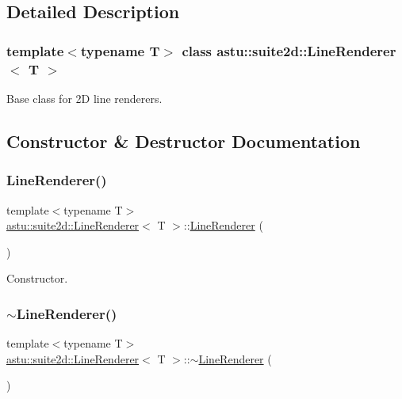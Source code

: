 \subsection{Detailed Description}
\subsubsection*{template$<$typename T$>$\newline
class astu\+::suite2d\+::\+Line\+Renderer$<$ T $>$}

Base class for 2D line renderers. 

\subsection{Constructor \& Destructor Documentation}
\mbox{\label{classastu_1_1suite2d_1_1LineRenderer_a8bb16da2cda699189626ffccb8de5857}} 
\subsubsection{\texorpdfstring{Line\+Renderer()}{LineRenderer()}}
{\footnotesize\ttfamily template$<$typename T$>$ \\
\hyperlink{classastu_1_1suite2d_1_1LineRenderer}{astu\+::suite2d\+::\+Line\+Renderer}$<$ T $>$\+::\hyperlink{classastu_1_1suite2d_1_1LineRenderer}{Line\+Renderer} (\begin{DoxyParamCaption}{ }\end{DoxyParamCaption})\hspace{0.3cm}{\ttfamily [inline]}}

Constructor. \mbox{\label{classastu_1_1suite2d_1_1LineRenderer_a585ff276f2e424e07aba120b0c4d0b7f}} 
\subsubsection{\texorpdfstring{$\sim$\+Line\+Renderer()}{~LineRenderer()}}
{\footnotesize\ttfamily template$<$typename T$>$ \\
\hyperlink{classastu_1_1suite2d_1_1LineRenderer}{astu\+::suite2d\+::\+Line\+Renderer}$<$ T $>$\+::$\sim$\hyperlink{classastu_1_1suite2d_1_1LineRenderer}{Line\+Renderer} (\begin{DoxyParamCaption}{ }\end{DoxyParamCaption})\hspace{0.3cm}{\ttfamily [inline]}}

